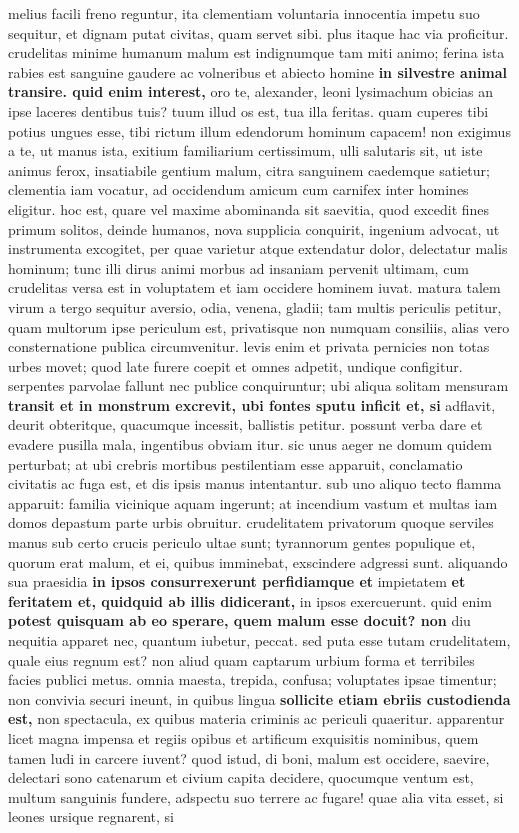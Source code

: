 melius facili freno reguntur, ita clementiam voluntaria innocentia impetu suo sequitur, et dignam putat civitas, quam servet sibi. plus itaque hac via proficitur. crudelitas minime humanum malum est indignumque tam miti animo; ferina ista rabies est sanguine gaudere ac volneribus et abiecto homine \textbf{in silvestre animal transire. quid enim interest,} oro te, alexander, leoni lysimachum obicias an ipse laceres dentibus tuis? tuum illud os est, tua illa feritas. quam cuperes tibi potius ungues esse, tibi rictum illum edendorum hominum capacem! non exigimus a te, ut manus ista, exitium familiarium certissimum, ulli salutaris sit, ut iste animus ferox, insatiabile gentium malum, citra sanguinem caedemque satietur; clementia iam vocatur, ad occidendum amicum cum carnifex inter homines eligitur. hoc est, quare vel maxime abominanda sit saevitia, quod excedit fines primum solitos, deinde humanos, nova supplicia conquirit, ingenium advocat, ut instrumenta excogitet, per quae varietur atque extendatur dolor, delectatur malis hominum; tunc illi dirus animi morbus ad insaniam pervenit ultimam, cum crudelitas versa est in voluptatem et iam occidere hominem iuvat. matura talem virum a tergo sequitur aversio, odia, venena, gladii; tam multis periculis petitur, quam multorum ipse periculum est, privatisque non numquam consiliis, alias vero consternatione publica circumvenitur. levis enim et privata pernicies non totas urbes movet; quod late furere coepit et omnes adpetit, undique configitur. serpentes parvolae fallunt nec publice conquiruntur; ubi aliqua solitam mensuram \textbf{transit et in \textbf{monstrum \textbf{excrevit, ubi fontes} sputu inficit et, si}} adflavit, deurit obteritque, quacumque incessit, ballistis petitur. possunt verba dare et evadere pusilla mala, ingentibus obviam itur. sic unus aeger ne domum quidem perturbat; at ubi crebris mortibus pestilentiam esse apparuit, conclamatio civitatis ac fuga est, et dis ipsis manus intentantur. sub uno aliquo tecto flamma apparuit: familia vicinique aquam ingerunt; at incendium vastum et multas iam domos depastum parte urbis obruitur. crudelitatem privatorum quoque serviles manus sub certo crucis periculo ultae sunt; tyrannorum gentes populique et, quorum erat malum, et ei, quibus imminebat, exscindere adgressi sunt. aliquando sua praesidia \textbf{\textbf{in ipsos consurrexerunt perfidiamque} et} impietatem \textbf{et feritatem et, quidquid ab illis didicerant,} in ipsos exercuerunt. quid enim \textbf{potest quisquam ab \textbf{eo sperare, quem malum esse} docuit? non} diu nequitia apparet nec, quantum iubetur, peccat. sed puta esse tutam crudelitatem, quale eius regnum est? non aliud quam captarum urbium forma et terribiles facies publici metus. omnia maesta, trepida, confusa; voluptates ipsae timentur; non convivia securi ineunt, in quibus lingua \textbf{\textbf{sollicite etiam ebriis custodienda} est,} non spectacula, ex quibus materia criminis ac periculi quaeritur. apparentur licet magna impensa et regiis opibus et artificum exquisitis nominibus, quem tamen ludi in carcere iuvent? quod istud, di boni, malum est occidere, saevire, delectari sono catenarum et civium capita decidere, quocumque ventum est, multum sanguinis fundere, adspectu suo terrere ac fugare! quae alia vita esset, si leones ursique regnarent, si 